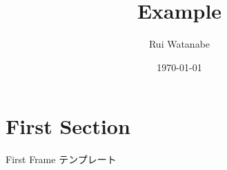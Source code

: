 \documentclass{beamer}
\title{Example}
\date{\today}
\author{Rui Watanabe}
\institute{Kagawa National Institute of Technology, Kagawa College}
\begin{document}
  \maketitle
  \section{First Section}
  \begin{frame}{First Frame}
    テンプレート
  \end{frame}
\end{document}
